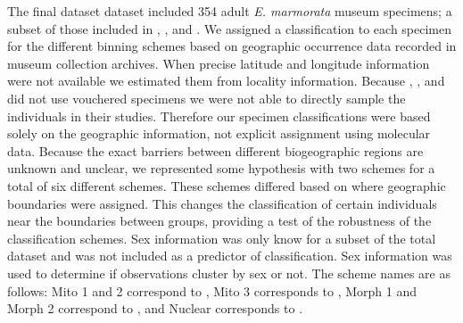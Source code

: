 \documentclass[12pt,letterpaper]{article}
\begin{document}
The final dataset dataset included 354 adult \textit{E. marmorata} museum specimens; a subset of those included in \citet{Angielczyk2007}, \citet{Angielczyk2011}, and \citet{Angielczyk2013a}. We assigned a classification to each specimen for the different binning schemes based on geographic occurrence data recorded in museum collection archives. When precise latitude and longitude information were not available we estimated them from locality information. Because \citet{Spinks2005}, \citet{Spinks2010}, and \citet{Spinks2014} did not use vouchered specimens we were not able to directly sample the individuals in their studies. Therefore our specimen classifications were based solely on the geographic information, not explicit assignment using molecular data. Because the exact barriers between different biogeographic regions are unknown and unclear, we represented some hypothesis with two schemes for a total of six different schemes. These schemes differed based on where geographic boundaries were assigned. This changes the classification of certain individuals near the boundaries between groups, providing a test of the robustness of the classification schemes. Sex information was only know for a subset of the total dataset and was not included as a predictor of classification. Sex information was used to determine if observations cluster by sex or not. The scheme names are as follows: Mito 1 and 2 correspond to \citet{Spinks2005}, Mito 3 corresponds to \citet{Spinks2010}, Morph 1 and Morph 2 correspond to \citet{Holland1992}, and Nuclear corresponds to \citet{Spinks2014}. 
\end{document}
